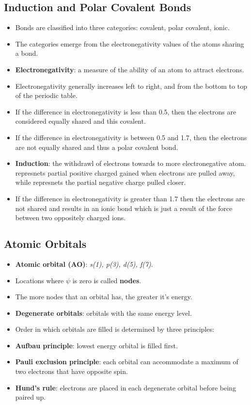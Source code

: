 \documentclass[12pt,a4paper]{article}
\begin{document}
\subsection{Induction and Polar Covalent Bonds}
\begin{itemize}
    \item Bonds are classified into three categories: covalent, polar covalent, ionic.
    \item The categories emerge from the electronegativity values of the atoms sharing a bond.
    \item \textbf{Electronegativity}: a measure of the ability of an atom to attract electrons.
    \item Electronegativity generally {\color{o-Sun}increases left to right}, and from the {\color{o-Sun}bottom to top} of the periodic table.
    \item If the difference in electronegativity is {\color{o-Sun}less than 0.5}, then the electrons are considered equally shared and this {\color{o-Sun}covalent}.
    \item If the difference in electronegativity is {\color{o-Sun}between 0.5 and 1.7}, then the electrons are not equally shared and thus a {\color{o-Sun}polar covalent bond}.
    \item \textbf{Induction}: the withdrawl of electrons towards to more electronegative atom. {\color{pos}\ch{$\delta$^+}} represnets partial positive charged gained when electrons are pulled away, while {\color{neg}\ch{$\delta$^-}} represnets the partial negative charge pulled closer.
    \item If the difference in electronegativity is {\color{o-Sun}greater than 1.7} then the electrons are not shared and results in an {\color{o-Sun}ionic bond} which is just a result of the force between two oppositely charged ions. 
\end{itemize}

\subsection{Atomic Orbitals}
\begin{itemize}
    \item \textbf{Atomic orbital (AO)}: \textit{s(1), p(3), d(5), f(7)}. 
    \item Locations where $\psi$ is zero is called \textbf{nodes}.
    \item The more nodes that an orbital has, the greater it's energy.
    \item \textbf{Degenerate orbitals}: orbitals with the same energy level.
    \item Order in which orbitals are filled is determined by three principles:
        \item \textbf{Aufbau principle}: lowest energy orbital is filled first.
        \item \textbf{Pauli exclusion principle}: each orbital can accommodate a maximum of two electrons that have opposite spin.
        \item \textbf{Hund's rule}: electrons are placed in each degenerate orbital before being paired up.
\end{itemize}
\end{document}
